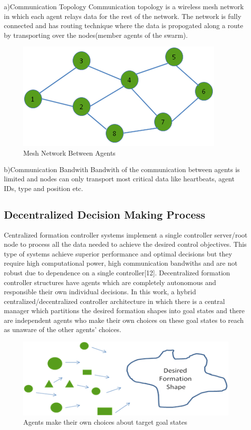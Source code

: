 a)Communication Topology
Communication topology is a wireless mesh network in which each agent relays data for the rest of the network. The network is fully connected and has routing technique where the data is propogated along a route by transporting over the nodes(member agents of the swarm).

\begin{figure}[H]
\caption{Mesh Network Between Agents}
\centering
\includegraphics[scale = 1]{mesh}
\end{figure} 

b)Communication Bandwith
Bandwith of the communication between agents is limited and nodes can only transport most critical data like heartbeats, agent IDs, type and position etc.

\subsection{ Decentralized Decision Making Process}
Centralized formation controller systems implement a single controller  server/root node
to process all the data needed to achieve the desired control objectives. This type of systems achieve superior performance and optimal decisions  but they require high computational power, high communication bandwiths and are not robust due to dependence on a single controller[12]. Decentralized formation controller structures have agents which are completely autonomous and responsible their own individual decisions. In this work, a hybrid centralized/decentralized controller architecture in which there is a central manager which partitions the desired formation shapes into goal states and there are independent agents who make their own choices on these goal states to reach as unaware of the other agents' choices.

\begin{figure}[H]
\caption{Agents make their own choices about target goal states}
\centering
\includegraphics[scale = 1]{decentralized}
\end{figure} 


